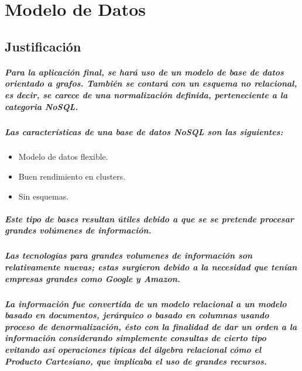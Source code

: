 \clearpage
\chapter{Modelo de Datos}

\section{Justificación}
\paragraph{Para la aplicación final, se hará uso de un modelo de base de datos orientado a grafos. También se contará con un esquema no relacional, es decir, se carece de una normalización definida, perteneciente a la categoria NoSQL.}
\paragraph{ Las características de una base de datos NoSQL son las siguientes: }

\begin{itemize}
  \item Modelo de datos flexible.
  \item Buen rendimiento en clusters. 
  \item Sin esquemas.
\end{itemize}

\paragraph{Este tipo de bases resultan útiles debido a que se se pretende procesar grandes volúmenes de información.}

\paragraph{Las tecnologías para grandes volumenes de información son relativamente nuevas; estas surgieron debido a la necesidad que tenían empresas grandes como Google y Amazon.} 

\paragraph{La información fue convertida de un modelo relacional a un modelo basado en documentos, jerárquico o basado en columnas usando proceso de denormalización, ésto con la finalidad de dar un orden a la información considerando simplemente consultas de cierto tipo evitando así operaciones típicas del álgebra relacional cómo el Producto Cartesiano, que implicaba el uso de grandes recursos.}

